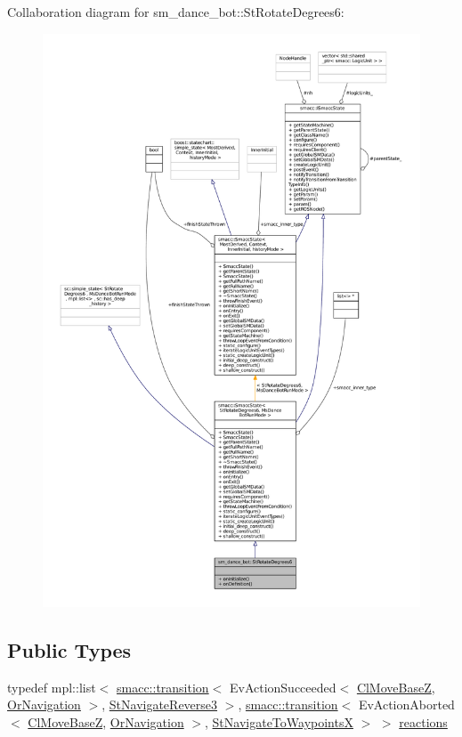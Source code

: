 Collaboration diagram for sm\+\_\+dance\+\_\+bot\+:\+:St\+Rotate\+Degrees6\+:
\nopagebreak
\begin{figure}[H]
\begin{center}
\leavevmode
\includegraphics[width=350pt]{structsm__dance__bot_1_1StRotateDegrees6__coll__graph}
\end{center}
\end{figure}
\subsection*{Public Types}
\begin{DoxyCompactItemize}
\item 
typedef mpl\+::list$<$ \hyperlink{classsmacc_1_1transition}{smacc\+::transition}$<$ Ev\+Action\+Succeeded$<$ \hyperlink{classmove__base__z__client_1_1ClMoveBaseZ}{Cl\+Move\+BaseZ}, \hyperlink{classsm__dance__bot_1_1OrNavigation}{Or\+Navigation} $>$, \hyperlink{structsm__dance__bot_1_1StNavigateReverse3}{St\+Navigate\+Reverse3} $>$, \hyperlink{classsmacc_1_1transition}{smacc\+::transition}$<$ Ev\+Action\+Aborted$<$ \hyperlink{classmove__base__z__client_1_1ClMoveBaseZ}{Cl\+Move\+BaseZ}, \hyperlink{classsm__dance__bot_1_1OrNavigation}{Or\+Navigation} $>$, \hyperlink{structsm__dance__bot_1_1StNavigateToWaypointsX}{St\+Navigate\+To\+WaypointsX} $>$ $>$ \hyperlink{structsm__dance__bot_1_1StRotateDegrees6_a2213d13d3f0ffd8d11e4f33151e4b840}{reactions}
\end{DoxyCompactItemize}
